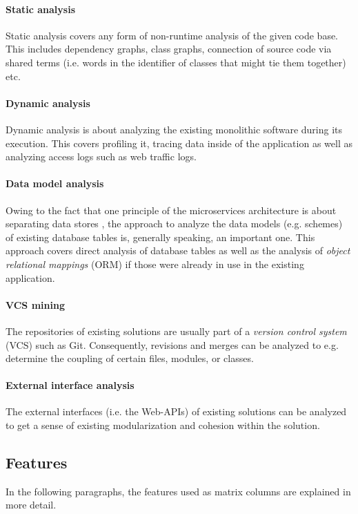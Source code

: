 \documentclass[12pt,a4paper]{report}
\begin{document}
\paragraph{Static analysis}
Static analysis covers any form of non\hyp runtime analysis of the given code base.
This includes dependency graphs, class graphs, connection of source code via shared terms
(i.e. words in the identifier of classes that might tie them together) etc.
\paragraph{Dynamic analysis}
Dynamic analysis is about analyzing the existing monolithic software during its execution.
This covers profiling it, tracing data inside of the application as well as analyzing
access logs such as web traffic logs.
\paragraph{Data model analysis}
Owing to the fact that one principle of the microservices architecture is about
separating data stores \cite{ms-microservices}, the approach to analyze
the data models (e.g. schemes) of existing database tables is, generally speaking,
an important one. This approach covers direct analysis of database tables
as well as the analysis of \textit{object relational mappings} (ORM)
if those were already in use in the existing application.
\paragraph{VCS mining}
The repositories of existing solutions are usually part of a
\textit{version control system} (VCS) such as Git. Consequently, revisions and merges
can be analyzed to e.g. determine the coupling of certain files, modules, or classes.
\paragraph{External interface analysis}
The external interfaces (i.e. the Web-APIs) of existing solutions can be analyzed to get
a sense of existing modularization and cohesion within the solution.


\subsection*{Features}

In the following paragraphs, the features used as matrix columns are explained in more detail.
\end{document}
